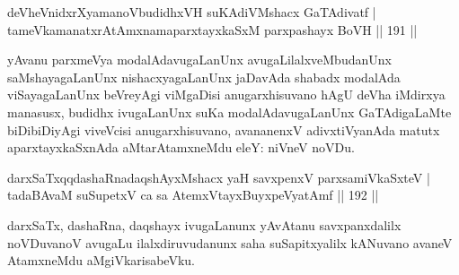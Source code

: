\begin{shl}
deVheVnidxrXyamanoVbudidhxVH suKAdiVMshacx GaTAdivatf | \\
tameVkamanatxrAtAmxnamaparxtayxkaSxM parxpashayx BoVH \hfill||  191 ||  
\end{shl}

\begin{artha}
yAvanu parxmeVya modalAdavugaLanUnx avugaLilalxveMbudanUnx saMshayagaLanUnx nishacxyagaLanUnx jaDavAda shabadx modalAda viSayagaLanUnx beVreyAgi viMgaDisi anugarxhisuvano hAgU deVha iMdirxya manasusx, budidhx ivugaLanUnx suKa modalAdavugaLanUnx GaTAdigaLaMte biDibiDiyAgi viveVcisi anugarxhisuvano, avananenxV adivxtiVyanAda matutx aparxtayxkaSxnAda aMtarAtamxneMdu eleY: niVneV noVDu.
\end{artha}

\begin{shl}
darxSaTxqqdashaRnadaqshAyxMshacx yaH savxpenxV parxsamiVkaSxteV | \\
tadaBAvaM suSupetxV ca sa AtemxVtayxBuyxpeVyatAmf \hfill||  192 ||  
\end{shl}

\begin{artha}
darxSaTx, dashaRna, daqshayx ivugaLanunx yAvAtanu savxpanxdalilx noVDuvanoV avugaLu ilalxdiruvudanunx saha suSapitxyalilx kANuvano avaneV AtamxneMdu aMgiVkarisabeVku.
\end{artha}
